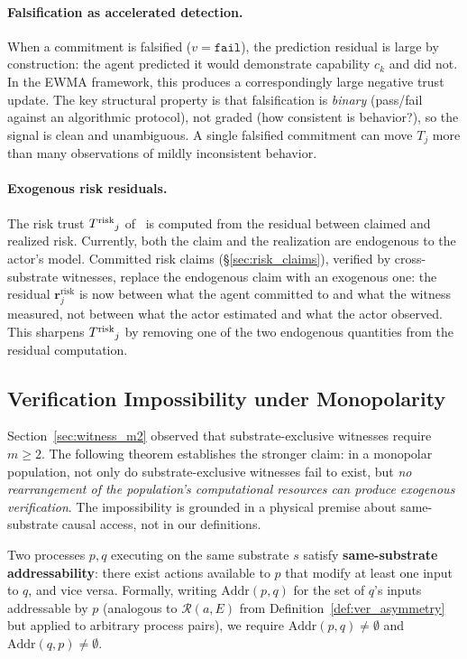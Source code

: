 \paragraph{Falsification as accelerated detection.}
When a commitment is falsified ($v = \texttt{fail}$), the prediction
residual is large by construction: the agent predicted it would
demonstrate capability $c_k$ and did not.  In the EWMA framework, this
produces a correspondingly large negative trust update.  The key
structural property is that falsification is \emph{binary} (pass/fail
against an algorithmic protocol), not graded (how consistent is
behavior?), so the signal is clean and unambiguous.  A single falsified
commitment can move $T_j$ more than many observations of mildly
inconsistent behavior.

\paragraph{Exogenous risk residuals.}
The risk trust ${T^{\mathrm{risk}}}_j$ of~\citet{lasser2026scm} is computed from the residual between
claimed and realized risk.  Currently, both the claim and the
realization are endogenous to the actor's model.  Committed risk claims
(\S\ref{sec:risk_claims}), verified by cross-substrate witnesses,
replace the endogenous claim with an exogenous one: the residual
$\mathbf{r}^{\mathrm{risk}}_j$ is now between what the agent committed
to and what the witness measured, not between what the actor estimated
and what the actor observed.  This sharpens ${T^{\mathrm{risk}}}_j$ by removing one
of the two endogenous quantities from the residual computation.

\subsection{Verification Impossibility under Monopolarity}
\label{sec:anti_monopolar}

Section~\ref{sec:witness_m2} observed that substrate-exclusive witnesses
require $m \geq 2$.  The following theorem establishes the stronger
claim: in a monopolar population, not only do substrate-exclusive
witnesses fail to exist, but \emph{no rearrangement of the population's
computational resources can produce exogenous verification}.  The
impossibility is grounded in a physical premise about same-substrate
causal access, not in our definitions.

\begin{definition}
\label{def:same_substrate}
Two processes $p, q$ executing on the same substrate $s$ satisfy
\textbf{same-substrate addressability}: there exist actions available
to $p$ that modify at least one input to $q$, and vice versa.
Formally, writing $\mathrm{Addr}(p, q)$ for the set of $q$'s inputs
addressable by $p$ (analogous to $\mathcal{R}(a, E)$ from
Definition~\ref{def:ver_asymmetry} but applied to arbitrary process
pairs), we require $\mathrm{Addr}(p, q) \neq \emptyset$ and
$\mathrm{Addr}(q, p) \neq \emptyset$.
\end{definition}

